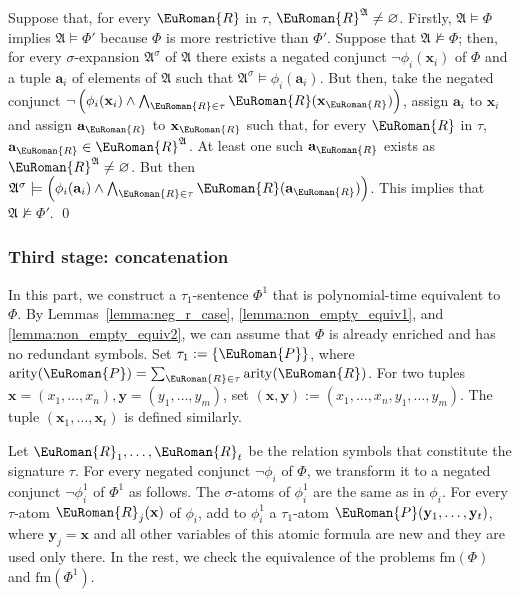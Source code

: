 \documentclass[10pt,a4paper]{amsart}
\theoremstyle{plain}
\theoremstyle{definition}
\numberwithin{equation}{section}
\newcommand{\eurm}[1]{\EuRoman{#1}} %
\newcommand{\structure}[1]{\mathfrak{#1}} %
\newcommand{\tuple}[1]{\mathbf{#1}} %
\newcommand{\rel}[1]{\eurm{#1}} %
\newcommand{\Sat}[0]{\ensuremath{\mathrm{fm}}}
\begin{document}
Suppose that, for every $\rel{R}$ in $\tau$, $\rel{R}^\structure{A}\not=\varnothing$. Firstly, $\structure{A}\models\Phi$ implies $\structure{A}\models\Phi'$ because $\Phi$ is more restrictive than $\Phi'$.
Suppose that $\structure{A}\not\models\Phi$; then, for every $\sigma$-expansion $\structure{A}^\sigma$ of $\structure{A}$ there exists a negated conjunct $\neg\phi_i(\tuple{x}_i)$ of $\Phi$ and a tuple $\tuple{a}_i$ of elements of $\structure{A}$ such that $\structure{A}^\sigma\models\phi_i(\tuple{a}_i)$.
But then, take the negated conjunct $\neg\left(\phi_i(\tuple{x}_i)\wedge\bigwedge_{\rel{R}\in\tau}\rel{R}(\tuple{x}_\rel{R})\right)$, assign $\tuple{a}_i$ to $\tuple{x}_i$ and assign $\tuple{a}_\rel{R}$ to $\tuple{x}_\rel{R}$ such that, for every $\rel{R}$ in $\tau$, $\tuple{a}_\rel{R}\in\rel{R}^\structure{A}$.
At least one such $\tuple{a}_\rel{R}$ exists as $\rel{R}^\structure{A}\not=\varnothing$.
But then $\structure{A}^\sigma\models\left(\phi_i(\tuple{a}_i)\wedge\bigwedge_{\rel{R}\in\tau}\rel{R}(\tuple{a}_\rel{R})\right)$.
This implies that $\structure{A}\not\models\Phi'$.
\qed

\subsubsection*{Third stage: concatenation}\label{constr:concatenation} In this part, we construct a $\tau_1$-sentence $\Phi^1$ that is polynomial-time equivalent to $\Phi$.
By Lemmas~\ref{lemma:neg_r_case}, \ref{lemma:non_empty_equiv1}, and \ref{lemma:non_empty_equiv2}, we can assume that $\Phi$ is already enriched and has no redundant symbols.
Set $\tau_1 := \{\rel{P}\}$, where $\mathrm{arity}(\rel{P}) = \sum_{\rel{R}\in\tau}\mathrm{arity}(\rel{R})$. For two tuples $\tuple{x}=(x_1,\ldots,x_n),\tuple{y}=(y_1,\ldots,y_m)$, set $(\tuple{x},\tuple{y}):=(x_1,\ldots,x_n,y_1,\ldots,y_m)$.
The tuple $(\tuple{x}_1,\ldots,\tuple{x}_t)$ is defined similarly.

Let $\rel{R}_1,\ldots,\rel{R}_t$ be the relation symbols that constitute the signature $\tau$. For every negated conjunct $\neg\phi_i$ of $\Phi$, we transform it to a negated conjunct $\neg\phi_i^1$ of $\Phi^1$ as follows.
The $\sigma$-atoms of $\phi_i^1$ are the same as in $\phi_i$. For every $\tau$-atom $\rel{R}_j(\tuple{x})$ of $\phi_i$, add to $\phi_i^1$ a $\tau_1$-atom $\rel{P}(\tuple{y}_1,\ldots,\tuple{y}_t)$, where $\tuple{y}_j=\tuple{x}$ and all other variables of this atomic formula are new and they are used only there.
In the rest, we check the equivalence of the problems $\Sat(\Phi)$ and $\Sat(\Phi^1)$. 
\end{document}
